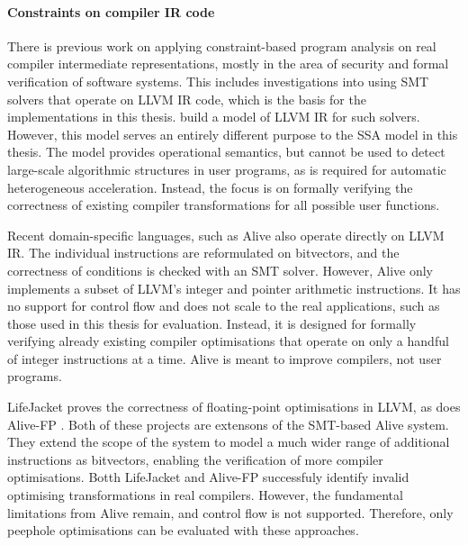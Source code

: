     \paragraph*{Constraints on compiler IR code}
    There is previous work on applying constraint-based program analysis on
    real compiler intermediate representations, mostly in the area of security
    and formal verification of software systems.
    This includes investigations into using SMT solvers that operate on LLVM IR
    code, which is the basis for the implementations in this thesis.
    \citet{Zhao:2012:FLI:2103656.2103709} build a model of LLVM IR for such
    solvers.
    However, this model serves an entirely different purpose to the SSA model
    in this thesis.
    The model provides operational semantics, but cannot be used to detect
    large-scale algorithmic structures in user programs, as is required for
    automatic heterogeneous acceleration.
    Instead, the focus is on formally verifying the correctness of existing
    compiler transformations for all possible user functions.

    Recent domain-specific languages, such as Alive
    \citep{Lopes:2015:PCP:2737924.2737965} also operate directly on LLVM IR.
    The individual instructions are reformulated on bitvectors, and the
    correctness of conditions is checked with an SMT solver.
    However, Alive only implements a subset of LLVM's integer and pointer
    arithmetic instructions.
    It has no support for control flow and does not scale to the real
    applications, such as those used in this thesis for evaluation.
    Instead, it is designed for formally verifying already existing
    compiler optimisations that operate on only a handful of integer
    instructions at a time.
    Alive is meant to improve compilers, not user programs.

    LifeJacket \citep{Notzli:2016:LVP:2931021.2931024} proves the correctness of
    floating-point optimisations in LLVM, as does Alive-FP \citep{Menendez2016}.
    Both of these projects are extensons of the SMT-based Alive system.
    They extend the scope of the system to model a much wider range of
    additional instructions as bitvectors, enabling the verification of more
    compiler optimisations.
    Botth LifeJacket and Alive-FP successfuly identify invalid optimising
    transformations in real compilers.
    However, the fundamental limitations from Alive remain, and control
    flow is not supported.
    Therefore, only peephole optimisations can be evaluated with these
    approaches.

